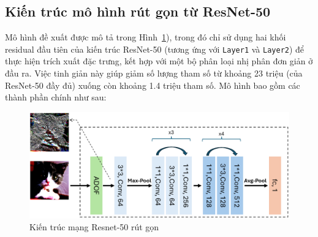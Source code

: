 \subsection{Kiến trúc mô hình rút gọn từ ResNet-50}
\label{sec:kien_truc_mo_hinh_rut_gon_tu_resnet_50}
Mô hình đề xuất được mô tả trong Hình~\ref{fig:figure_model_architecture}), trong đó chỉ sử dụng hai khối residual đầu tiên của kiến trúc ResNet-50 (tương ứng với \texttt{Layer1} và \texttt{Layer2}) để thực hiện trích xuất đặc trưng, kết hợp với một bộ phân loại nhị phân đơn giản ở đầu ra. Việc tinh giản này giúp giảm số lượng tham số từ khoảng 23 triệu (của ResNet-50 đầy đủ) xuống còn khoảng 1.4 triệu tham số. Mô hình bao gồm các thành phần chính như sau:
%
\begin{figure}[h!]
	\centering
	\includegraphics[width=1.0\linewidth]{Images/figure_model_architecture.png}
	\begin{minipage}{1.0\linewidth}
		\vspace{5mm}
		\caption{Kiến trúc mạng Resnet-50 rút gọn}
		\label{fig:figure_model_architecture}
	\end{minipage}
\end{figure}
%
%

